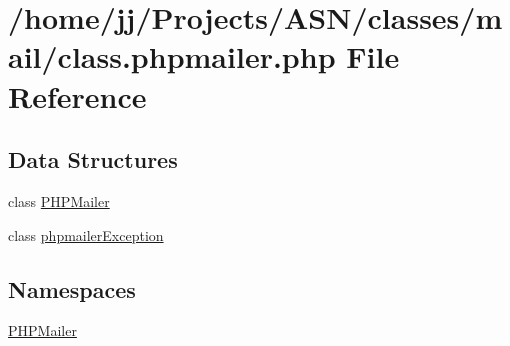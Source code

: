 \hypertarget{class_8phpmailer_8php}{}\section{/home/jj/\+Projects/\+A\+S\+N/classes/mail/class.phpmailer.\+php File Reference}
\label{class_8phpmailer_8php}
\subsection*{Data Structures}
\begin{DoxyCompactItemize}
\item 
class \hyperlink{class_p_h_p_mailer}{P\+H\+P\+Mailer}
\item 
class \hyperlink{classphpmailer_exception}{phpmailer\+Exception}
\end{DoxyCompactItemize}
\subsection*{Namespaces}
\begin{DoxyCompactItemize}
\item 
 \hyperlink{namespace_p_h_p_mailer}{P\+H\+P\+Mailer}
\end{DoxyCompactItemize}
